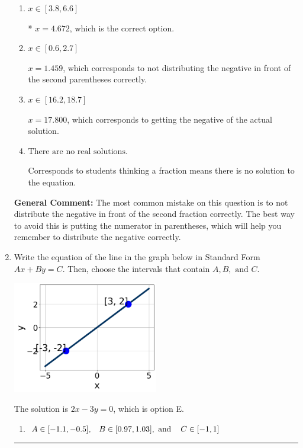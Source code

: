 \documentclass{extbook}[14pt]
\newcommand{\litem}[1]{\item #1

\rule{\textwidth}{0.4pt}}
\begin{document}
\begin{enumerate}
{\begin{enumerate}[label=\Alph*.]
$x = -1.459$, which corresponds to not distributing the negative in front of the first parentheses correctly.
\item \( x \in [3.8, 6.6] \)

* $x = 4.672$, which is the correct option.
\item \( x \in [0.6, 2.7] \)

$x = 1.459$, which corresponds to not distributing the negative in front of the second parentheses correctly.
\item \( x \in [16.2, 18.7] \)

$x = 17.800$, which corresponds to getting the negative of the actual solution.
\item \( \text{There are no real solutions.} \)

Corresponds to students thinking a fraction means there is no solution to the equation.
\end{enumerate}

\textbf{General Comment:} The most common mistake on this question is to not distribute the negative in front of the second fraction correctly. The best way to avoid this is putting the numerator in parentheses, which will help you remember to distribute the negative correctly.
}
\litem{
Write the equation of the line in the graph below in Standard Form $Ax+By=C$. Then, choose the intervals that contain $A, B, \text{ and } C$.

\begin{center}
    \includegraphics[width=0.5\textwidth]{../Figures/linearGraphToStandardCopyB.png}
\end{center}


The solution is \( 2x - 3y = 0 \), which is option E.\begin{enumerate}[label=\Alph*.]
\item \( A \in [-1.1, -0.5], \hspace{3mm} B \in [0.97, 1.03], \text{ and } \hspace{3mm} C \in [-1, 1] \)


\end{enumerate}}
\end{enumerate}
\end{document}
